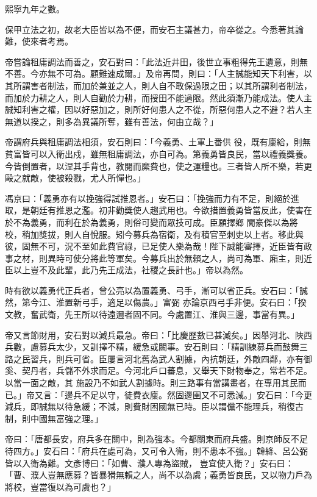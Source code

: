 \begin{pinyinscope}
 熙寧九年之數。



 保甲立法之初，故老大臣皆以為不便，而安石主議甚力，帝卒從之。今悉著其論難，使來者考焉。



 帝嘗論租庸調法而善之，安石對曰：「此法近井田，後世立事粗得先王遺意，則無
 不善。今亦無不可為。顧難速成爾。」及帝再問，則曰：「人主誠能知天下利害，以其所謂害者制法，而加於兼並之人，則人自不敢保過限之田；以其所謂利者制法，而加於力耕之人，則人自勸於力耕，而授田不能過限。然此須漸乃能成法。使人主誠知利害之權，因以好惡加之，則所好何患人之不從，所惡何患人之不避？若人主無道以揆之，則多為異議所奪，雖有善法，何由立哉？」



 帝謂府兵與租庸調法相須，安石則曰：「今義勇、土軍上番供
 役，既有廩給，則無貧富皆可以入衛出戍，雖無租庸調法，亦自可為。第義勇皆良民，當以禮義獎養。今皆倒置者，以涅其手背也，教閱而縻費也，使之運糧也。三者皆人所不樂，若更毆之就敵，使被殺戮，尤人所憚也。」



 馮京曰：「義勇亦有以挽強得試推恩者。」安石曰：「挽強而力有不足，則絕於進取，是朝廷有推恩之濫。初非勸獎使人趨武用也。今欲措置義勇皆當反此，使害在於不為義勇，而利在於為義勇，則俗可變而眾技可成。臣願擇鄉
 閭豪傑以為將校，稍加獎拔，則人自悅服。矧今募兵為宿衛，及有積官至刺吏以上者。移此與彼，固無不可，況不至如此費官祿，已足使人樂為哉！陛下誠能審擇，近臣皆有政事之材，則異時可使分將此等軍矣。今募兵出於無賴之人，尚可為軍、廂主，則近臣以上豈不及此輩，此乃先王成法，社稷之長計也。」帝以為然。



 時有欲以義勇代正兵者，曾公亮以為置義勇、弓手，漸可以省正兵。安石曰：「誠然，第今江、淮置新弓手，適足以傷農。」富弼
 亦論京西弓手非便。安石曰：「揆文教，奮武衛，先王所以待遠邇者固不同。今處置江、淮與三邊，事當有異。」



 帝又言節財用，安石對以減兵最急。帝曰：「比慶歷數已甚減矣。」因舉河北、陜西兵數，慮募兵太少，又訓擇不精，緩急或闕事。安石則曰：「精訓練募兵而鼓舞三路之民習兵，則兵可省。臣屢言河北舊為武人割據，內抗朝廷，外敵四鄰，亦有御奚、契丹者，兵儲不外求而足。今河北戶口蕃息，又舉天下財物奉之，常若不足。以當一面之敵，其
 施設乃不如武人割據時。則三路事有當講畫者，在專用其民而已。」帝又言：「邊兵不足以守，徒費衣廩。然固邊圉又不可悉減。」安石曰：「今更減兵，即誠無以待急緩；不減，則費財困國無已時。臣以謂儻不能理兵，稍復古制，則中國無富強之理。」



 帝曰：「唐都長安，府兵多在關中，則為強本。今都關東而府兵盛。則京師反不足待四方。」安石曰：「府兵在處可為，又可令入衛，則不患本不強。」韓絳、呂公弼皆以入衛為難。文彥博曰：「如曹、濮人專為盜賊，
 豈宜使入衛？」安石曰：「曹、濮人豈無應募？皆暴猾無賴之人，尚不以為虞；義勇皆良民，又以物力戶為將校，豈當復以為可虞也？」




\end{pinyinscope}
